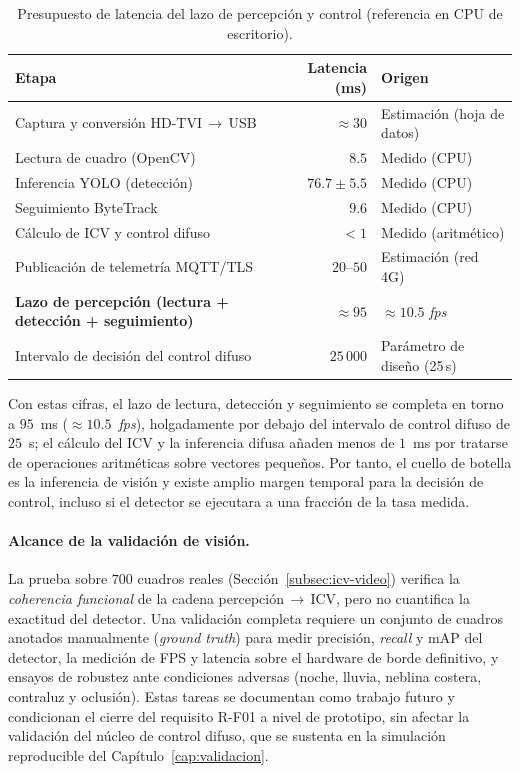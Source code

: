 \begin{table}[H]
  \centering
  \footnotesize
  \caption{Presupuesto de latencia del lazo de percepción y control (referencia en CPU de escritorio).}
  \label{tab:latencia}
  \begin{tabularx}{\linewidth}{@{}>{\raggedright\arraybackslash}X r >{\raggedright\arraybackslash}p{3.6cm}@{}}
    \toprule
    \textbf{Etapa} & \textbf{Latencia (ms)} & \textbf{Origen}\\
    \midrule
    Captura y conversión HD-TVI\,$\rightarrow$\,USB & $\approx 30$ & Estimación (hoja de datos)\\
    Lectura de cuadro (OpenCV) & $8.5$ & Medido (CPU)\\
    Inferencia YOLO (detección) & $76.7\pm5.5$ & Medido (CPU)\\
    Seguimiento ByteTrack & $9.6$ & Medido (CPU)\\
    Cálculo de ICV y control difuso & $<1$ & Medido (aritmético)\\
    Publicación de telemetría MQTT/TLS & $20$--$50$ & Estimación (red 4G)\\
    \midrule
    \textbf{Lazo de percepción (lectura + detección + seguimiento)} & $\approx 95$ & $\approx 10.5$ \emph{fps}\\
    Intervalo de decisión del control difuso & $25\,000$ & Parámetro de diseño (25\,s)\\
    \bottomrule
  \end{tabularx}
\end{table}

Con estas cifras, el lazo de lectura, detección y seguimiento se completa en torno a $95$~ms
($\approx 10.5$~\emph{fps}), holgadamente por debajo del intervalo de control difuso de $25$~s; el cálculo del
ICV y la inferencia difusa añaden menos de $1$~ms por tratarse de operaciones aritméticas sobre vectores
pequeños. Por tanto, el cuello de botella es la inferencia de visión y existe amplio margen temporal para la
decisión de control, incluso si el detector se ejecutara a una fracción de la tasa medida.

\paragraph{Alcance de la validación de visión.} La prueba sobre $700$ cuadros reales
(Sección~\ref{subsec:icv-video}) verifica la \emph{coherencia funcional} de la cadena
percepción\,$\rightarrow$\,ICV, pero no cuantifica la exactitud del detector. Una validación completa requiere
un conjunto de cuadros anotados manualmente (\emph{ground truth}) para medir precisión, \emph{recall} y mAP del
detector, la medición de FPS y latencia sobre el hardware de borde definitivo, y ensayos de robustez ante
condiciones adversas (noche, lluvia, neblina costera, contraluz y oclusión). Estas tareas se documentan como
trabajo futuro y condicionan el cierre del requisito R-F01 a nivel de prototipo, sin afectar la validación del
núcleo de control difuso, que se sustenta en la simulación reproducible del Capítulo~\ref{cap:validacion}.

